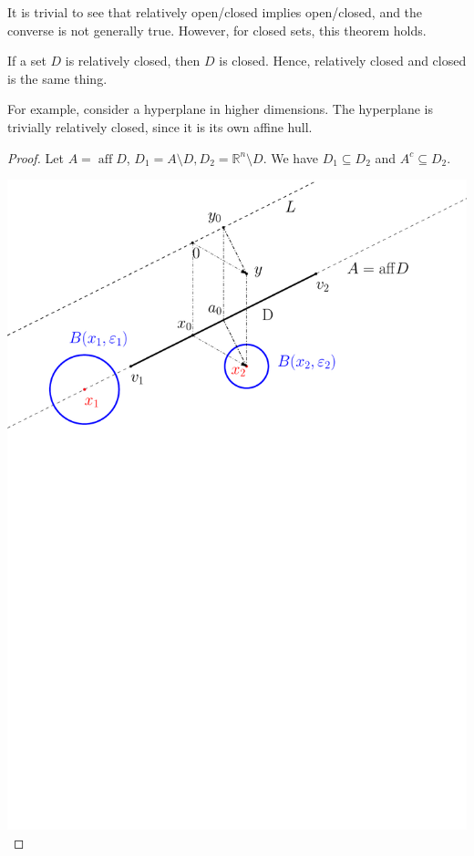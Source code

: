 It is trivial to see that relatively open/closed implies
open/closed, and the converse is not generally true. However, for closed
sets, this theorem holds.

\begin{theorem}
\label{thr:Relatively closed implies closed}
  If a set \( D \) is relatively closed, then \( D \) is closed.
  Hence, relatively closed and closed is the same thing.
\end{theorem}

For example, consider a hyperplane in higher dimensions. The hyperplane is
trivially relatively closed, since it is its own affine hull.

\begin{proof}
  Let \( A = \operatorname{aff} D \), \( D_{1} = A \setminus D, D_{2} =
  \mathbb{R}^{n} \setminus D \). We have \( D_{1} \subseteq D_{2} \) and \(
  A^{c} \subseteq D_{2} \).

  \includegraphics[scale=0.5]{figures/a}
  


\end{proof}
